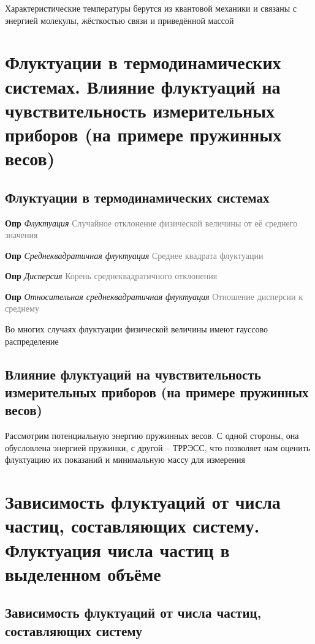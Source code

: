 \documentclass[a4paper, 14pt]{article}
\begin{document}
    Характеристические температуры берутся из квантовой механики и связаны с энергией молекулы, жёсткостью связи и
    приведённой массой
    
    \section{Флуктуации в термодинамических системах.
    Влияние флуктуаций на чувствительность измерительных приборов (на примере пружинных весов)}
    
    \subsection{Флуктуации в термодинамических системах}
    
    \textbf{Опр} \textit{Флуктуация} \textcolor{gray}{Случайное отклонение физической величины от её среднего значения}
    
    \textbf{Опр} \textit{Среднеквадратичная флуктуация} \textcolor{gray}{Среднее квадрата флуктуации}
    
    \textbf{Опр} \textit{Дисперсия} \textcolor{gray}{Корень среднеквадратичного отклонения}
    
    \textbf{Опр} \textit{Относительная среднеквадратичная флуктуация} \textcolor{gray}{Отношение дисперсии к среднему}
    
    Во многих случаях флуктуации физической величины имеют гауссово распределение
    
    \subsection{Влияние флуктуаций на чувствительность измерительных приборов (на примере пружинных весов)}
    
    Рассмотрим потенциальную энергию пружинных весов.
    С одной стороны, она обусловлена энергией пружинки, с другой -- ТРРЭСС, что позволяет нам оценить флуктуацию
    их показаний и минимальную массу для измерения
    
    \section{Зависимость флуктуаций от числа частиц, составляющих систему.
    Флуктуация числа частиц в выделенном объёме}
    
    \subsection{Зависимость флуктуаций от числа частиц, составляющих систему}
    
\end{document}
